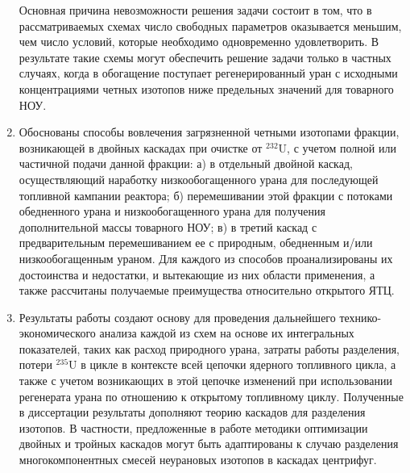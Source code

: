 \begin{enumerate}[label=\Roman*.]
Основная причина невозможности решения задачи состоит в том, что в рассматриваемых схемах число свободных параметров оказывается меньшим, чем число условий, которые необходимо одновременно удовлетворить. В результате такие схемы могут обеспечить решение задачи только в частных случаях, когда в обогащение поступает регенерированный уран с исходными концентрациями четных изотопов ниже предельных значений для товарного НОУ.

\item Обоснованы способы вовлечения загрязненной четными изотопами фракции, возникающей в двойных каскадах при очистке от $^{232}$U, с учетом полной или частичной подачи данной фракции: а) в отдельный двойной каскад, осуществляющий наработку низкообогащенного урана для последующей топливной кампании реактора; б) перемешивании этой фракции с потоками обедненного урана и низкообогащенного урана для получения дополнительной массы товарного НОУ; в) в третий каскад с предварительным перемешиванием ее с природным, обедненным и/или низкообогащенным ураном. Для каждого из способов проанализированы их достоинства и недостатки, и вытекающие из них области применения, а также рассчитаны получаемые преимущества относительно открытого ЯТЦ.
 
\item Результаты работы создают основу для проведения дальнейшего технико-экономического анализа каждой из схем на основе их интегральных показателей, таких как расход природного урана, затраты работы разделения, потери $^{235}$U в цикле в контексте всей цепочки ядерного топливного цикла, а также с учетом возникающих в этой цепочке изменений при использовании регенерата урана по отношению к открытому топливному циклу. Полученные в диссертации результаты дополняют теорию каскадов для разделения изотопов. В частности, предложенные в работе методики оптимизации двойных и тройных каскадов могут быть адаптированы к случаю разделения многокомпонентных смесей неурановых изотопов в каскадах центрифуг.

\end{enumerate}

